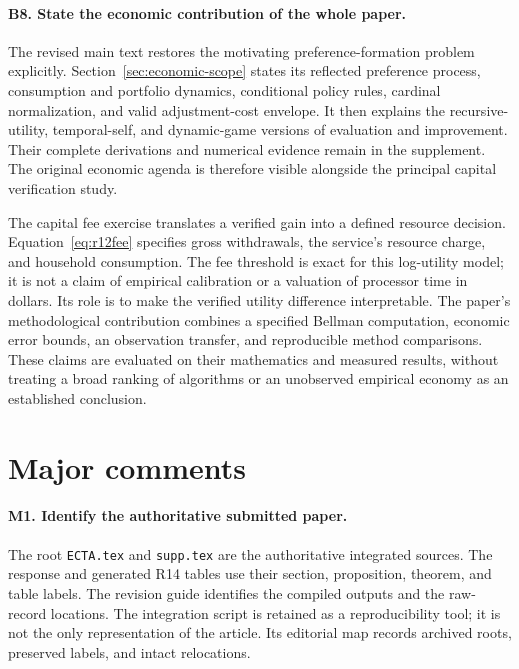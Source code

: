 \paragraph*{B8. State the economic contribution of the whole paper.}
The revised main text restores the motivating preference-formation problem explicitly. Section~\ref{sec:economic-scope} states its reflected preference process, consumption and portfolio dynamics, conditional policy rules, cardinal normalization, and valid adjustment-cost envelope. It then explains the recursive-utility, temporal-self, and dynamic-game versions of evaluation and improvement. Their complete derivations and numerical evidence remain in the supplement. The original economic agenda is therefore visible alongside the principal capital verification study.

The capital fee exercise translates a verified gain into a defined resource decision. Equation~\ref{eq:r12fee} specifies gross withdrawals, the service's resource charge, and household consumption. The fee threshold is exact for this log-utility model; it is not a claim of empirical calibration or a valuation of processor time in dollars. Its role is to make the verified utility difference interpretable. The paper's methodological contribution combines a specified Bellman computation, economic error bounds, an observation transfer, and reproducible method comparisons. These claims are evaluated on their mathematics and measured results, without treating a broad ranking of algorithms or an unobserved empirical economy as an established conclusion.

\section*{Major comments}

\paragraph*{M1. Identify the authoritative submitted paper.}
The root \texttt{ECTA.tex} and \texttt{supp.tex} are the authoritative integrated sources. The response and generated R14 tables use their section, proposition, theorem, and table labels. The revision guide identifies the compiled outputs and the raw-record locations. The integration script is retained as a reproducibility tool; it is not the only representation of the article. Its editorial map records archived roots, preserved labels, and intact relocations.

